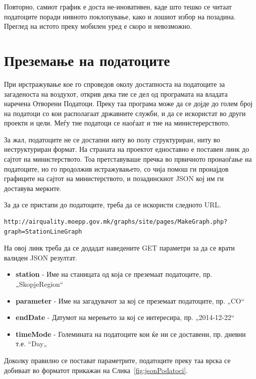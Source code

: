 \documentclass{uvamscse}
\begin{document}
Повторно, самиот график е доста не-иновативен, каде што тешко се читаат податоците поради нивното поклопување, како и лошиот избор на позадина. Преглед на истото преку мобилен уред е скоро и невозможно.


\section{Преземање на податоците}

При ирстражување кое го спроведов околу достапноста на податоците за загаденоста на воздухот, открив дека тие се дел од програмата на владата наречена Отворени Податоци. Преку таа програма може да се дојде до голем број на податоци со кои располагаат државните служби, и да се искористат во други проекти и цели. Меѓу тие податоци се наоѓаат и тие на министерерството.
\vspace{5mm}

За жал, податоците не се достапни ниту во полу структуриран, ниту во неструктуриран формат. На страната на проектот едноставно е поставен линк до сајтот на министерството. Тоа претставуваше пречка во првичното пронаоѓање на податоците, но го продолжив истражувањето, со чија помош ги пронајдов графиците на сајтот на министерството, и позадинскиот JSON кој им ги доставува мерките. 
\vspace{5mm}

За да се пристапи до податоците, треба да се искористи следното URL.
\vspace{5mm}

\begin{snippet}
\begin{verbatim}
http://airquality.moepp.gov.mk/graphs/site/pages/MakeGraph.php?graph=StationLineGraph
\end{verbatim}
\end{snippet}
\vspace{5mm}

На овој линк треба да се додадат наведените GET параметри за да се врати валиден JSON резултат.

\begin{itemize}
\item \textbf{station} - Име на станицата од која се преземаат податоците, пр. „SkopjeRegion“
\item \textbf{parameter} - Име на загадувачот за кој се преземаат податоците, пр. „CO“
\item \textbf{endDate} - Датумот на мерењето за кој се интересира, пр. „2014-12-22“
\item \textbf{timeMode} - Големината на податоците кои ќе ни се доставени, пр. дневни т.е. “Day„
\end{itemize}
\newpage
Доколку правилно се постават параметрите, податоците преку таа врска се добиваат во форматот прикажан на Слика~\ref{fig:jsonPodatoci}.
\end{document}
